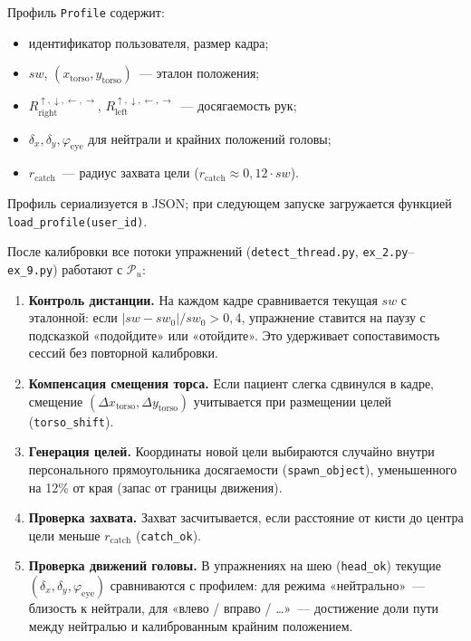 Профиль \texttt{Profile} содержит:
\begin{itemize}
    \item идентификатор пользователя, размер кадра;
    \item $sw$, $(x_{\mathrm{torso}}, y_{\mathrm{torso}})$~---
    эталон положения;
    \item $R_{\mathrm{right}}^{\uparrow,\downarrow,\leftarrow,\rightarrow}$,
    $R_{\mathrm{left}}^{\uparrow,\downarrow,\leftarrow,\rightarrow}$~---
    досягаемость рук;
    \item $\delta_x, \delta_y, \varphi_{\mathrm{eye}}$ для нейтрали
    и крайних положений головы;
    \item $r_{\mathrm{catch}}$~--- радиус захвата цели
    ($r_{\mathrm{catch}} \approx 0{,}12 \cdot sw$).
\end{itemize}

Профиль сериализуется в JSON; при следующем запуске загружается
функцией \texttt{load\_profile(user\_id)}.


После калибровки все потоки упражнений (\texttt{detect\_thread.py},
\texttt{ex\_2.py}--\texttt{ex\_9.py}) работают с $\mathcal{P}_u$:

\begin{enumerate}
    \item \textbf{Контроль дистанции.}
    На каждом кадре сравнивается текущая $sw$ с эталонной:
    если $|sw - sw_0| / sw_0 > 0{,}4$, упражнение ставится на паузу
    с подсказкой «подойдите» или «отойдите». Это удерживает
    сопоставимость сессий без повторной калибровки.

    \item \textbf{Компенсация смещения торса.}
    Если пациент слегка сдвинулся в кадре, смещение
    $(\Delta x_{\mathrm{torso}}, \Delta y_{\mathrm{torso}})$
    учитывается при размещении целей (\texttt{torso\_shift}).

    \item \textbf{Генерация целей.}
    Координаты новой цели выбираются случайно внутри
    персонального прямоугольника досягаемости (\texttt{spawn\_object}),
    уменьшенного на 12\% от края (запас от границы движения).

    \item \textbf{Проверка захвата.}
    Захват засчитывается, если расстояние от кисти до центра цели
    меньше $r_{\mathrm{catch}}$ (\texttt{catch\_ok}).

    \item \textbf{Проверка движений головы.}
    В упражнениях на шею (\texttt{head\_ok}) текущие
    $(\delta_x, \delta_y, \varphi_{\mathrm{eye}})$ сравниваются
    с профилем: для режима «нейтрально»~--- близость к нейтрали,
    для «влево / вправо / …»~--- достижение доли пути между
    нейтралью и калиброванным крайним положением.
\end{enumerate}

